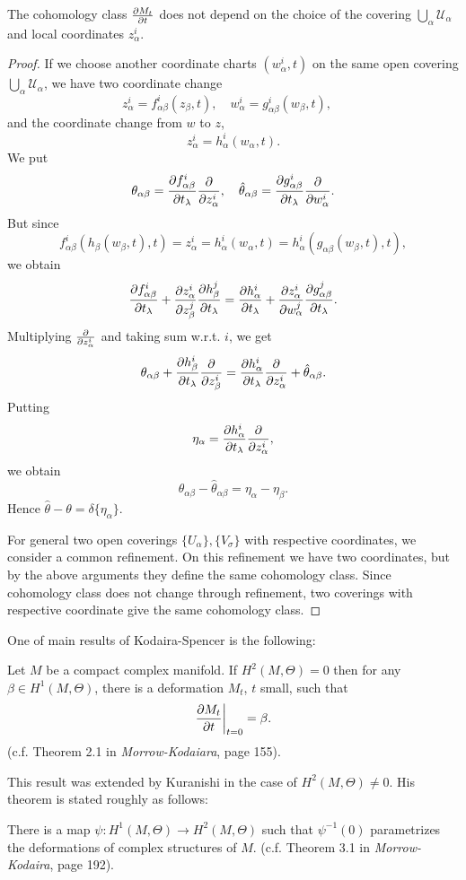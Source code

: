 \documentclass[12pt]{article}
\begin{document}
\begin{prop}
  The cohomology class \(\pdv{M_t}{t}\) does not depend on the choice of the 
  covering \(\bigcup_{\alpha}\mathcal{U}_\alpha\) and local coordinates
  \(z_\alpha^i\).
\end{prop}
\begin{proof}
  If we choose another coordinate charts \((w_\alpha^i,t)\) on the same open
  covering \(\bigcup_{\alpha}\mathcal{U}_\alpha\), we have two coordinate
  change \[
    z_\alpha^i=f_{\alpha\beta}^i(z_\beta,t),\quad
    w_\alpha^i=g_{\alpha\beta}^i(w_\beta,t),\quad
  \] and the coordinate change from \(w\) to \(z\), \[
    z_\alpha^i=h_\alpha^i(w_\alpha,t)
  .\] We put \[
    \theta_{\alpha\beta}=\pdv{f_{\alpha\beta}^i}{t_\lambda}\pdv{}{z_\alpha^i},\quad
    \hat{\theta}_{\alpha\beta}=\pdv{g_{\alpha\beta}^i}{t_\lambda}\pdv{}{w_\alpha^i}
  .\] But since \[
    f_{\alpha\beta}^i(h_\beta(w_\beta,t),t)=z_\alpha^i
    =h_\alpha^i(w_\alpha,t)=h_\alpha^i(g_{\alpha\beta}(w_\beta,t),t)
  ,\] we obtain \[
    \pdv{f_{\alpha\beta}^i}{t_\lambda}+\pdv{z_\alpha^i}{z_\beta^j}
    \pdv{h_\beta^j}{t_\lambda}=\pdv{h_\alpha^i}{t_\lambda}
    +\pdv{z_\alpha^i}{w_\alpha^j}\pdv{g_{\alpha\beta}^j}{t_\lambda}
  .\] Multiplying \(\pdv{}{z_\alpha^i}\) and taking sum w.r.t. \(i\), we get \[
    \theta_{\alpha\beta}+\pdv{h_\beta^i}{t_\lambda}\pdv{}{z_\beta^i}
    =\pdv{h_{\alpha}^i}{t_\lambda}\pdv{}{z_\alpha^i}+\hat{\theta}_{\alpha\beta}
  .\] Putting  \[
    \eta_\alpha=\pdv{h_\alpha^i}{t_\lambda}\pdv{}{z_\alpha^i} 
  ,\] we obtain \[
    \theta_{\alpha\beta}-\hat{\theta}_{\alpha\beta}=\eta_\alpha-\eta_\beta
  .\] Hence \(\hat{\theta}-\theta=\delta\{\eta_\alpha\}\).

  For general two open coverings \(\{U_\alpha\},\{V_\sigma\}\) with respective
  coordinates, we consider a common refinement. On this refinement we have two
  coordinates, but by the above arguments they define the same cohomology class.
  Since cohomology class does not change through refinement, two coverings with
  respective coordinate give the same cohomology class.
\end{proof}

One of main results of Kodaira-Spencer is the following:
\begin{theorem}
  Let  \(M\) be a compact complex manifold. If \(H^2(M,\Theta)=0\) then for any
  \(\beta\in H^1(M,\Theta)\), there is a deformation \(M_t\), \(t\) small,
  such that \[
    \pdv{M_t}{t}\bigg|_{t=0}=\beta
  .\] (c.f. Theorem 2.1 in \emph{Morrow-Kodaiara}, page 155).
\end{theorem}
This result was extended by Kuranishi in the case of \(H^2(M,\Theta)\neq 0\).
His theorem is stated roughly as follows:
\begin{theorem}
  There is a map \(\psi\colon H^1(M,\Theta)\to H^2(M,\Theta)\) such that
  \(\psi^{-1}(0)\) parametrizes the deformations of complex structures of \(M\).
  (c.f. Theorem 3.1 in \emph{Morrow-Kodaira}, page 192).
\end{theorem}
\end{document}
